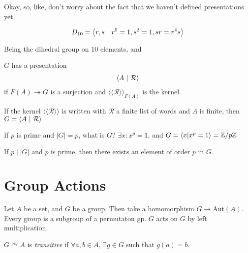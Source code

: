 \documentclass[12pt, twosided]{article}
\begin{document}
\begin{exa}
  Okay, so, like, don't worry about the fact that we haven't defined presentations yet.

  \begin{align*}
    D_{10} = \left\langle r,s \ \middle\vert\  r^5 = 1, s^2 = 1, sr = r^4s \right\rangle
  \end{align*}

  Being the dihedral group on 10 elements, and

  \begin{center}
  \end{center}
\end{exa}

\begin{df}
  \(G\) has a presentation
  \begin{align*}
    \left\langle A \ \middle\vert\  \mathcal{R} \right\rangle
  \end{align*}
  if \(F(A) \twoheadrightarrow G\) is a surjection and \(\langle\langle \mathcal{R} \rangle\rangle_{F(A)}\) is the kernel.

  If the kernel \(\langle\langle \mathcal{R} \rangle\rangle\) is written with \(\mathcal{R}\) a finite list of words and \(A\) is finite, then \(G = \left\langle A \ \middle\vert\  \mathcal{R}\right\rangle\)
\end{df}

If \(p\) is prime and \(|G| = p\), what is \(G\)? \(\exists x: x^p = 1\), and \(G = \langle x \vert x^p = 1 \rangle = \mathbb{Z} / p\mathbb{Z}\)

\begin{thm}
  If \(p \mid |G|\) and \(p\) is prime, then there exists an element of order \(p\) in \(G\).
\end{thm}
\section{Group Actions}
Let \(A\) be a set, and \(G\) be a group. Then take a homomorphism \(G \to \mathrm{Aut}(A)\). Every group is a subgroup of a permutaton gp. \(G\) acts on \(G\) by left multiplication.

\begin{df}
  \(G \curvearrowright A\) is \textit{transitive} if \(\forall a, b \in A\), \(\exists g \in G\) such that \(g(a) = b\).
\end{df}
\end{document}
